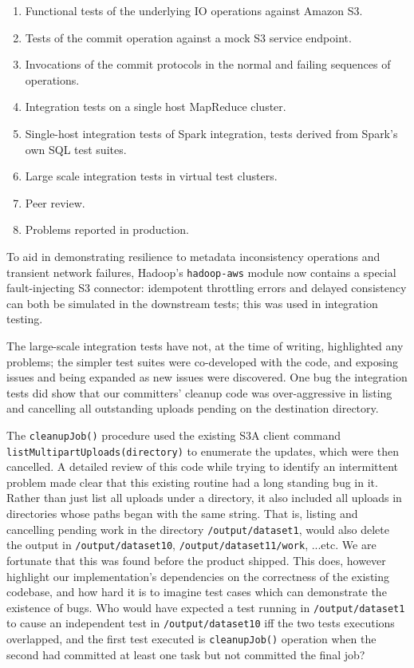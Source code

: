 \documentclass[format=acmsmall, screen=true, nonacm, timestamp, review=false]{acmart}
\begin{document}
\begin{enumerate}
  \item Functional tests of the underlying IO operations against Amazon S3.
  \item Tests of the commit operation against a mock S3 service endpoint.
  \item Invocations of the commit protocols in the normal and failing sequences of operations.
  \item Integration tests on a single host MapReduce cluster.
  \item Single-host integration tests of Spark integration, tests derived from Spark's own SQL test suites.
  \item Large scale integration tests in virtual test clusters.
  \item Peer review.
  \item Problems reported in production.
\end{enumerate}

To aid in demonstrating resilience to metadata inconsistency
operations and transient network failures, Hadoop's \texttt{hadoop-aws} module
now contains a special fault-injecting S3 connector: idempotent throttling errors and
delayed consistency can both be simulated in the downstream tests;
this was used in integration testing.

The large-scale integration tests have not, at the time of writing, highlighted any problems;
the simpler test suites were co-developed with the code, and exposing issues and
being expanded as new issues were discovered.
One bug the integration tests did show that our committers' cleanup code was
over-aggressive in listing and cancelling all outstanding uploads pending
on the destination directory.


The \texttt{cleanupJob()} procedure used the existing S3A client command
\texttt{listMultipartUploads(directory)} to enumerate the updates,
which were then cancelled.
A detailed review of this code while trying to identify an intermittent problem
made clear that this existing routine had a long standing bug in it.
Rather than just list all uploads under a directory, it also included
all uploads in directories whose paths began with the same string.
That is, listing and cancelling pending work in the directory \texttt{/output/dataset1},
would also delete the output in \texttt{/output/dataset10}, \texttt{/output/dataset11/work},
...etc.
We are fortunate that this was found before the product shipped.
This does, however highlight our implementation's dependencies on the correctness
of the existing codebase, and how hard it is to imagine test cases which
can demonstrate the existence of bugs.
Who would have expected a test running in \texttt{/output/dataset1} to
cause an independent test in \texttt{/output/dataset10} iff the two tests
executions overlapped, and the first test executed is \texttt{cleanupJob()}
operation when the second had committed at least one task but not committed
the final job?
\end{document}
